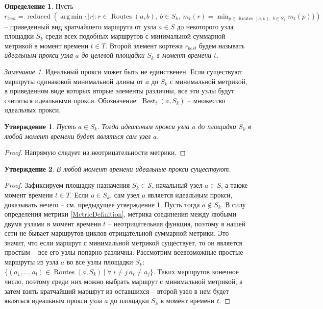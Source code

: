 \documentclass{article}
\theoremstyle{plain}
\theoremstyle{plain}
\theoremstyle{plain}
\theoremstyle{plain}
\newtheorem{claim}{Утверждение}[section]
\theoremstyle{definition}
\newtheorem{definition}{Определение}[section]
\theoremstyle{remark}
\newtheorem{remark}{Замечание}[section]
\theoremstyle{plain}
\DeclareMathOperator*{\argmin}{arg\,min}
\DeclareMathOperator*{\best}{Best}
\DeclareMathOperator*{\routes}{Routes}
\DeclareMathOperator*{\reduced}{reduced}
\begin{document}
\begin{definition}
\label{IdealProxyDefinition}
    Пусть $r_{best} = \reduced( \argmin \{ |r| : r \in \routes(a,b),\ b \in S_k,\ m_t(r) = \displaystyle \min_{p \in \routes(a,b),\ b \in S_k} m_t(p) \} )$ -- приведенный вид кратчайшего маршрута от узла $a \in S$ до некоторого узла площадки $S_k$ среди всех подобных маршрутов с минимальной суммарной метрикой в момент времени $t \in T$. Второй элемент кортежа $r_{best}$ будем называть \textit{идеальным прокси узла $a$ до целевой площадки $S_k$ в момент времени $t$}.
\end{definition}

\begin{remark}
    Идеальный прокси может быть не единственен. Если существуют маршруты одинаковой минимальной длины от $a$ до $S_k$ с минимальной метрикой, в приведенном виде которых вторые элементы различны, все эти узлы будут считаться идеальными прокси. Обозначение: $\best_t(a, S_k)$ -- множество идеальных прокси.
\end{remark}

\begin{claim}
\label{SelfProxy}
    Пусть $a \in S_k$. Тогда идеальным прокси узла $a$ до площадки $S_k$ в любой момент времени будет являться сам узел $a$.
\end{claim}
\begin{proof}
    Напрямую следует из неотрицательности метрики.
\end{proof}

\begin{claim}
\label{IdealProxyExistance}
    В любой момент времени идеальные прокси существуют.
\end{claim}
\begin{proof}
    Зафиксируем площадку назначения $S_k \in \mathcal{S}$, начальный узел $a \in S$, а также момент времени $t \in T$. Если $a \in S_k$, сам узел $a$ является идеальным прокси, доказывать нечего -- см. предыдущее утверждение \ref{SelfProxy}. Пусть тогда $a \notin S_k$. В силу определения метрики \ref{MetricDefinition}, метрика соединения между любыми двумя узлами в момент времени $t$ -- неотрицательная функция, поэтому в нашей сети не бывает маршрутов-циклов отрицательной суммарной метрики. Это значит, что если маршрут с минимальной метрикой существует, то он является простым -- все его узлы попарно различны. Рассмотрим всевозможные простые маршруты из узла $a$ во все узлы площадки $S_k$: $\{(a_1, \ldots, a_l) \in \routes(a, S_k)\ |\ \forall\ i \neq j\ a_i \neq a_j\}$. Таких маршрутов конечное число, поэтому среди них можно выбрать маршрут с минимальной метрикой, а затем взять кратчайший маршрут из оставшихся -- второй узел в нем будет являться идеальным прокси узла $a$ до площадки $S_k$ в момент времени $t$.
\end{proof}
\end{document}
